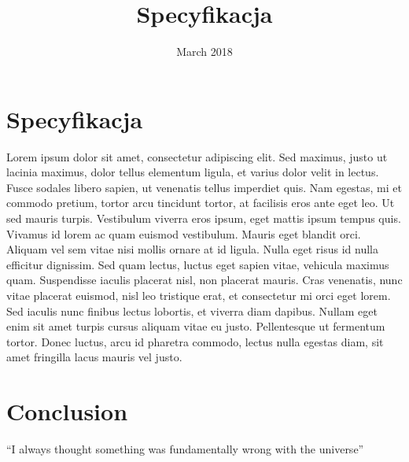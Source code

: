 \documentclass{article}
\title{Specyfikacja}
\date{March 2018}
\begin{document}
\maketitle

\section{Specyfikacja}
Lorem ipsum dolor sit amet, consectetur adipiscing elit. Sed maximus, justo ut lacinia maximus, dolor tellus elementum ligula, et varius dolor velit in lectus. Fusce sodales libero sapien, ut venenatis tellus imperdiet quis. Nam egestas, mi et commodo pretium, tortor arcu tincidunt tortor, at facilisis eros ante eget leo. Ut sed mauris turpis. Vestibulum viverra eros ipsum, eget mattis ipsum tempus quis. Vivamus id lorem ac quam euismod vestibulum. Mauris eget blandit orci. Aliquam vel sem vitae nisi mollis ornare at id ligula. Nulla eget risus id nulla efficitur dignissim. Sed quam lectus, luctus eget sapien vitae, vehicula maximus quam. Suspendisse iaculis placerat nisl, non placerat mauris. Cras venenatis, nunc vitae placerat euismod, nisl leo tristique erat, et consectetur mi orci eget lorem. Sed iaculis nunc finibus lectus lobortis, et viverra diam dapibus. Nullam eget enim sit amet turpis cursus aliquam vitae eu justo. Pellentesque ut fermentum tortor. Donec luctus, arcu id pharetra commodo, lectus nulla egestas diam, sit amet fringilla lacus mauris vel justo.



\section{Conclusion}
``I always thought something was fundamentally wrong with the universe'' \citep{adams1995hitchhiker}
\end{document}
